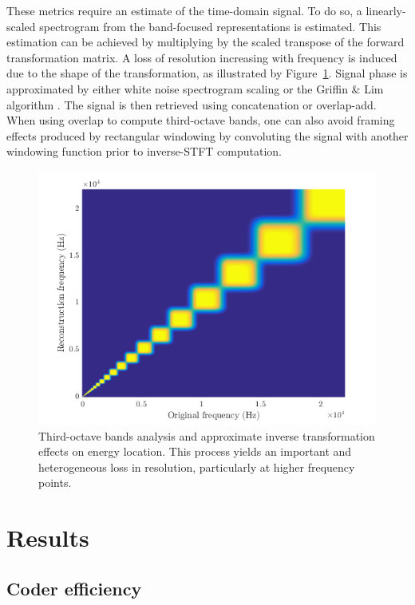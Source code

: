 \documentclass[final,3p,times,twocolumn]{elsarticle}
\begin{document}
These metrics require an estimate of the time-domain signal. To do so, a linearly-scaled spectrogram from the band-focused representations is estimated. This estimation can be achieved by multiplying by the scaled transpose of the forward transformation matrix. A loss of resolution increasing with frequency is induced due to the shape of the transformation, as illustrated by Figure~\ref{fig:freq}. Signal phase is approximated by either white noise spectrogram scaling or the Griffin \& Lim algorithm \cite{griffin1984}. The signal is then retrieved using concatenation or overlap-add. When using overlap to compute third-octave bands, one can also avoid framing effects produced by rectangular windowing by convoluting the signal with another windowing function prior to inverse-STFT computation.\\

\begin{figure}[htbp]
	\centering
		\includegraphics[width=\columnwidth]{figures/freq.png}
	\caption{Third-octave bands analysis and approximate inverse transformation effects on energy location. This process yields an important and heterogeneous loss in resolution, particularly at higher frequency points.}
	\label{fig:freq}
\end{figure}



\section{Results} \label{sec:results}

\subsection{Coder efficiency}
\end{document}
